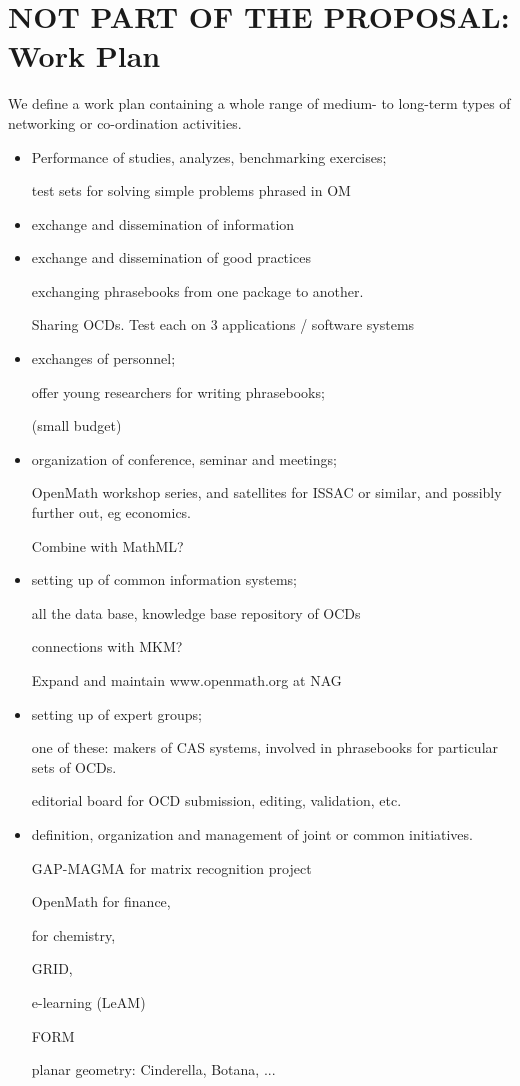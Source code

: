 \documentclass[draft]{artikel3}
\begin{document}
\section{NOT PART OF THE PROPOSAL: Work Plan}
We define a work plan containing a whole range of medium- to long-term
types of networking or co-ordination activities.
\begin{itemize}
\item Performance of studies, analyzes, benchmarking exercises;

test sets for  solving simple problems phrased in OM


\item exchange and dissemination of information

\item exchange and dissemination of good practices

exchanging phrasebooks from one package to another.

Sharing OCDs.
Test each on 3 applications / software systems

\item exchanges of personnel;

offer young researchers for writing phrasebooks;

(small  budget)


\item organization of conference, seminar and meetings;

OpenMath workshop series, and satellites for ISSAC or similar, and
possibly further out, eg economics.

Combine with MathML?

\item setting up of common information systems;

all the data base, knowledge base repository of OCDs

connections with MKM?

Expand and maintain www.openmath.org at NAG


\item setting up of expert groups;

one of these: makers of CAS systems, involved in phrasebooks for
particular sets of OCDs.

editorial board for OCD submission, editing, validation, etc.

\item definition, organization and management of joint or common
  initiatives.

GAP-MAGMA for matrix recognition project

OpenMath for finance,

for chemistry,

GRID,

e-learning (LeAM)

FORM

planar geometry: Cinderella, Botana, ...



\end{itemize}
\end{document}
